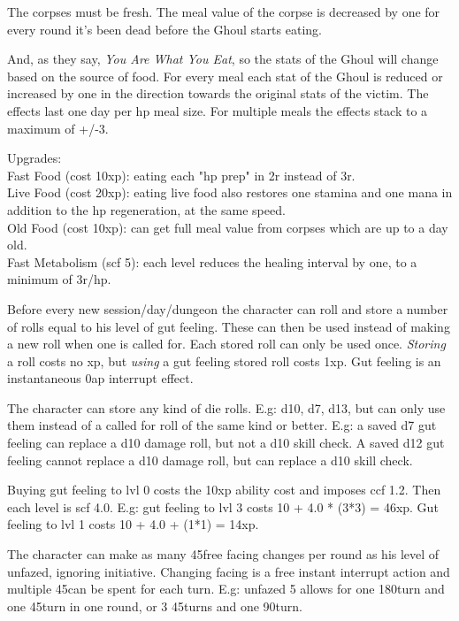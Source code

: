 The corpses must be fresh. The meal value of the corpse is decreased by one for every round it's been dead before the Ghoul starts eating.

And, as they say, \emph{You Are What You Eat}, so the stats of the Ghoul will change based on the source of food. For every meal each stat of the Ghoul is reduced or increased by one in the direction towards the original stats of the victim. The effects last one day per hp meal size. For multiple meals the effects stack to a maximum of +/-3.

Upgrades:\\
Fast Food (cost 10xp): eating each "hp prep" in 2r instead of 3r.\\
Live Food (cost 20xp): eating live food also restores one stamina and one mana in addition to the hp regeneration, at the same speed.\\
Old Food (cost 10xp): can get full meal value from corpses which are up to a day old. \\
Fast Metabolism (scf 5): each level reduces the healing interval by one, to a minimum of 3r/hp.


 Before every new session/day/dungeon the character can roll and store a number of rolls equal to his level of gut feeling. These can then be used instead of making a new roll when one is called for. Each stored roll can only be used once. \emph{Storing} a roll costs no xp, but \emph{using} a gut feeling stored roll costs 1xp. Gut feeling is an instantaneous 0ap interrupt effect.

The character can store any kind of die rolls. E.g: d10, d7, d13, but can only use them instead of a called for roll of the same kind or better. E.g: a saved d7 gut feeling can replace a d10 damage roll, but not a d10 skill check. A saved d12 gut feeling cannot replace a d10 damage roll, but can replace a d10 skill check.

Buying gut feeling to lvl 0 costs the 10xp ability cost and imposes ccf 1.2. Then each level is scf 4.0. E.g: gut feeling to lvl 3 costs 10 + 4.0 * (3*3) = 46xp. Gut feeling to lvl 1 costs 10 + 4.0 + (1*1) = 14xp.



 The character can make as many 45\degrees free facing changes per round as his level of unfazed, ignoring initiative. Changing facing is a free instant interrupt action and multiple 45\degrees can be spent for each turn. E.g: unfazed 5 allows for one 180\degrees turn and one 45\degrees turn in one round, or 3 45\degrees turns and one 90\degrees turn.

